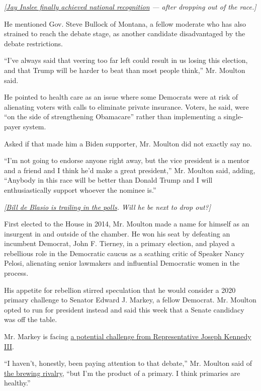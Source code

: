\emph{{[}}\href{https://www.nytimes.com/2019/08/23/us/politics/jay-inslee.html}{\emph{Jay
Inslee finally achieved national recognition}} \emph{--- after dropping
out of the race.{]}}

He mentioned Gov. Steve Bullock of Montana, a fellow moderate who has
also strained to reach the debate stage, as another candidate
disadvantaged by the debate restrictions.

``I've always said that veering too far left could result in us losing
this election, and that Trump will be harder to beat than most people
think,'' Mr. Moulton said.

He pointed to health care as an issue where some Democrats were at risk
of alienating voters with calls to eliminate private insurance. Voters,
he said, were ``on the side of strengthening Obamacare'' rather than
implementing a single-payer system.

Asked if that made him a Biden supporter, Mr. Moulton did not exactly
say no.

``I'm not going to endorse anyone right away, but the vice president is
a mentor and a friend and I think he'd make a great president,'' Mr.
Moulton said, adding, ``Anybody in this race will be better than Donald
Trump and I will enthusiastically support whoever the nominee is.''

\emph{{[}}\href{https://www.nytimes.com/2019/08/23/nyregion/de-blasio-town-hall-cnn.html}{\emph{Bill
de Blasio is trailing in the polls}}\emph{. Will he be next to drop
out?{]}}

First elected to the House in 2014, Mr. Moulton made a name for himself
as an insurgent in and outside of the chamber. He won his seat by
defeating an incumbent Democrat, John F. Tierney, in a primary election,
and played a rebellious role in the Democratic caucus as a scathing
critic of Speaker Nancy Pelosi, alienating senior lawmakers and
influential Democratic women in the process.

His appetite for rebellion stirred speculation that he would consider a
2020 primary challenge to Senator Edward J. Markey, a fellow Democrat.
Mr. Moulton opted to run for president instead and said this week that a
Senate candidacy was off the table.

Mr. Markey is facing
\href{https://www.nytimes.com/2019/08/17/us/politics/joseph-kennedy-edward-markey-senate.html}{a
potential challenge from Representative Joseph Kennedy III}.

``I haven't, honestly, been paying attention to that debate,'' Mr.
Moulton said of
\href{https://www.nytimes.com/2019/08/23/us/politics/kennedy-markey-senate-2020.html}{the
brewing rivalry}, ``but I'm the product of a primary. I think primaries
are healthy.''

